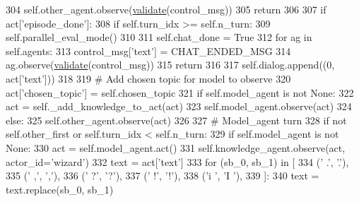 \begin{DoxyCode}
304                 self.other\_agent.observe(\hyperlink{namespaceparlai_1_1core_1_1worlds_afc3fad603b7bce41dbdc9cdc04a9c794}{validate}(control\_msg))
305             \textcolor{keywordflow}{return}
306 
307         \textcolor{keywordflow}{if} act[\textcolor{stringliteral}{'episode\_done'}]:
308             \textcolor{keywordflow}{if} self.turn\_idx >= self.n\_turn:
309                 self.parallel\_eval\_mode()
310 
311                 self.chat\_done = \textcolor{keyword}{True}
312                 \textcolor{keywordflow}{for} ag \textcolor{keywordflow}{in} self.agents:
313                     control\_msg[\textcolor{stringliteral}{'text'}] = CHAT\_ENDED\_MSG
314                     ag.observe(\hyperlink{namespaceparlai_1_1core_1_1worlds_afc3fad603b7bce41dbdc9cdc04a9c794}{validate}(control\_msg))
315             \textcolor{keywordflow}{return}
316 
317         self.dialog.append((0, act[\textcolor{stringliteral}{'text'}]))
318 
319         \textcolor{comment}{# Add chosen topic for model to observe}
320         act[\textcolor{stringliteral}{'chosen\_topic'}] = self.chosen\_topic
321         \textcolor{keywordflow}{if} self.model\_agent \textcolor{keywordflow}{is} \textcolor{keywordflow}{not} \textcolor{keywordtype}{None}:
322             act = self.\_add\_knowledge\_to\_act(act)
323             self.model\_agent.observe(act)
324         \textcolor{keywordflow}{else}:
325             self.other\_agent.observe(act)
326 
327         \textcolor{comment}{# Model\_agent turn}
328         \textcolor{keywordflow}{if} \textcolor{keywordflow}{not} self.other\_first \textcolor{keywordflow}{or} self.turn\_idx < self.n\_turn:
329             \textcolor{keywordflow}{if} self.model\_agent \textcolor{keywordflow}{is} \textcolor{keywordflow}{not} \textcolor{keywordtype}{None}:
330                 act = self.model\_agent.act()
331                 self.knowledge\_agent.observe(act, actor\_id=\textcolor{stringliteral}{'wizard'})
332                 text = act[\textcolor{stringliteral}{'text'}]
333                 \textcolor{keywordflow}{for} (sb\_0, sb\_1) \textcolor{keywordflow}{in} [
334                     (\textcolor{stringliteral}{' .'}, \textcolor{stringliteral}{'.'}),
335                     (\textcolor{stringliteral}{' ,'}, \textcolor{stringliteral}{','}),
336                     (\textcolor{stringliteral}{' ?'}, \textcolor{stringliteral}{'?'}),
337                     (\textcolor{stringliteral}{' !'}, \textcolor{stringliteral}{'!'}),
338                     (\textcolor{stringliteral}{'i '}, \textcolor{stringliteral}{'I '}),
339                 ]:
340                     text = text.replace(sb\_0, sb\_1)

\end{DoxyCode}
